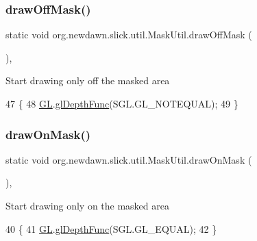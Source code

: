 \subsubsection{\texorpdfstring{draw\+Off\+Mask()}{drawOffMask()}}
{\footnotesize\ttfamily static void org.\+newdawn.\+slick.\+util.\+Mask\+Util.\+draw\+Off\+Mask (\begin{DoxyParamCaption}{ }\end{DoxyParamCaption})\hspace{0.3cm}{\ttfamily [inline]}, {\ttfamily [static]}}

Start drawing only off the masked area 
\begin{DoxyCode}
47                                      \{
48         \mbox{\hyperlink{classorg_1_1newdawn_1_1slick_1_1util_1_1_mask_util_a0a8dc1ea7550e654529a6f92dadea889}{GL}}.\mbox{\hyperlink{interfaceorg_1_1newdawn_1_1slick_1_1opengl_1_1renderer_1_1_s_g_l_a3704d17846e7513cc280e6275c73ace9}{glDepthFunc}}(SGL.GL\_NOTEQUAL);
49     \}
\end{DoxyCode}
\mbox{\label{classorg_1_1newdawn_1_1slick_1_1util_1_1_mask_util_a6653026353cf1f1726a47229baa0a3f4}} 
\subsubsection{\texorpdfstring{draw\+On\+Mask()}{drawOnMask()}}
{\footnotesize\ttfamily static void org.\+newdawn.\+slick.\+util.\+Mask\+Util.\+draw\+On\+Mask (\begin{DoxyParamCaption}{ }\end{DoxyParamCaption})\hspace{0.3cm}{\ttfamily [inline]}, {\ttfamily [static]}}

Start drawing only on the masked area 
\begin{DoxyCode}
40                                     \{
41         \mbox{\hyperlink{classorg_1_1newdawn_1_1slick_1_1util_1_1_mask_util_a0a8dc1ea7550e654529a6f92dadea889}{GL}}.\mbox{\hyperlink{interfaceorg_1_1newdawn_1_1slick_1_1opengl_1_1renderer_1_1_s_g_l_a3704d17846e7513cc280e6275c73ace9}{glDepthFunc}}(SGL.GL\_EQUAL);
42     \}
\end{DoxyCode}
\mbox{\label{classorg_1_1newdawn_1_1slick_1_1util_1_1_mask_util_a96a931dbb0d5d98dbfb107da8bd4dc79}} 
